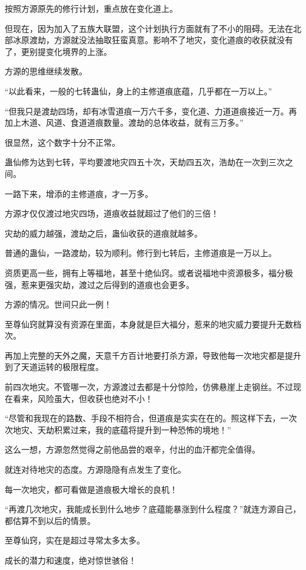 \begin{this_body}
按照方源原先的修行计划，重点放在变化道上。

但现在，因为加入了五族大联盟，这个计划执行方面就有了不小的阻碍。无法在北部冰原渡劫，方源就没法抽取狂蛮真意。影响不了地灾，变化道痕的收获就没有了，更别提变化境界的上涨。

方源的思维继续发散。

“以此看来，一般的七转蛊仙，身上的主修道痕底蕴，几乎都在一万以上。”

“但我只是渡劫四场，却有冰雪道痕一万六千多，变化道、力道道痕接近一万。再加上木道、风道、食道道痕数量。渡劫的总体收益，就有三万多。”

很显然，这个数字十分不正常。

蛊仙修为达到七转，平均要渡地灾四五十次，天劫四五次，浩劫在一次到三次之间。

一路下来，增添的主修道痕，才一万多。

方源才仅仅渡过地灾四场，道痕收益就超过了他们的三倍！

灾劫的威力越强，渡劫之后，蛊仙收获的道痕就越多。

普通的蛊仙，一路渡劫，较为顺利。修行到七转后，主修道痕是一万以上。

资质更高一些，拥有上等福地，甚至十绝仙窍。或者说福地中资源极多，福分极强，惹来更强灾劫，渡过之后得到的道痕也会更多。

方源的情况。世间只此一例！

至尊仙窍就算没有资源在里面，本身就是巨大福分，惹来的地灾威力要提升无数档次。

再加上完整的天外之魔，天意千方百计地要打杀方源，导致他每一次地灾都是提升到了天道运转的极限程度。

前四次地灾。不管哪一次，方源渡过去都是十分惊险，仿佛悬崖上走钢丝。不过现在看来，风险虽大，但收获也绝对不小！

“尽管和我现在的路数、手段不相符合，但道痕是实实在在的。照这样下去，一次次地灾、天劫积累过来，我的底蕴将提升到一种恐怖的境地！”

这么一想，方源忽然觉得之前他品尝的艰辛，付出的血汗都完全值得。

就连对待地灾的态度。方源隐隐有点发生了变化。

每一次地灾，都可看做是道痕极大增长的良机！

“再渡几次地灾，我能成长到什么地步？底蕴能暴涨到什么程度？”就连方源自己，都估算不到以后的情景。

至尊仙窍，实在是超过寻常太多太多。

成长的潜力和速度，绝对惊世骇俗！


\end{this_body}
